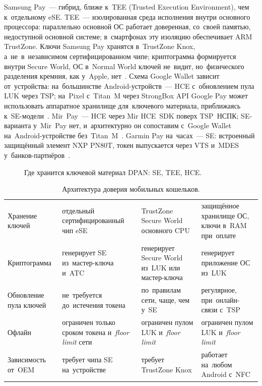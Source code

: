 Samsung Pay~--- гибрид, ближе к~TEE (Trusted Execution Environment), чем
к~отдельному eSE. TEE~--- изолированная среда исполнения внутри основного
процессора: параллельно основной ОС работает доверенная, со~своей памятью,
недоступной основной системе; в~смартфонах эту изоляцию обеспечивает
ARM TrustZone. Ключи Samsung Pay хранятся в~TrustZone Knox, а~не~в~независимом
сертифицированном чипе; криптограмма формируется внутри Secure World, ОС
в~Normal World ключей не~видит, но~физического разделения кремния, как у~Apple,
нет~\cite{samsung-pay-tee}. Схема Google Wallet зависит от~устройства:
на~большинстве Android-устройств~--- HCE с~обновлением пула LUK через TSP;
на~Pixel с~Titan~M через
StrongBox API Google Pay может использовать аппаратное хранилище для~ключевого
материала, приближаясь к~SE-модели~\cite{google-wallet-titan-m}. Mir~Pay~---
HCE через Mir HCE~SDK поверх TSP~НСПК; SE-варианта у~Mir~Pay нет,
и~архитектурно он сопоставим с~Google Wallet на~Android-устройстве
без~Titan~M~\cite{nspk-tsp}. Garmin Pay на~часах~--- SE: встроенный
защищённый элемент NXP PN80T, токен выпускается через VTS и~MDES
у~банков-партнёров~\cite{nxp-garmin-pay-2018}.

\begin{figure}[tbp]
  \centering
  \caption{Где хранится ключевой материал DPAN: SE, TEE, HCE.}\label{fig:device-trust-topology}
\end{figure}

\begin{table}[tbp]
  \caption{Архитектура доверия мобильных кошельков.}\label{tab:contactless-wallets-by-trust}
  \begingroup
  \tablesetup
  \begin{tabularx}{\textwidth}{
      @{}P{0.18\textwidth}
      Y Y Y@{}
    }
    \toprule
    \headrow
     &  &
     &  \\
    \midrule
    Хранение ключей       & отдельный сертифицированный чип eSE & TrustZone Secure World основного CPU & защищённое хранилище ОС, ключи в~RAM при~оплате \\
    \rowsep
    Криптограмма          & генерирует SE из~мастер-ключа и~ATC & генерирует Secure World из~LUK или мастер-ключа & генерирует приложение ОС из~LUK \\
    \rowsep
    Обновление пула ключей & не~требуется до~истечения токена & по~правилам сети, чаще, чем у~SE & регулярное, при~онлайн-связи с~TSP \\
    \rowsep
    Офлайн                & ограничен только сроком токена и~\textit{floor limit} сети & ограничен пулом LUK и~\textit{floor limit} & ограничен пулом LUK и~\textit{floor limit} \\
    \rowsep
    Зависимость от~OEM    & требует чипа SE на~устройстве & требует TrustZone Knox & работает на~любом Android с~NFC \\
    \bottomrule
  \end{tabularx}\par
  \endgroup
\end{table}

